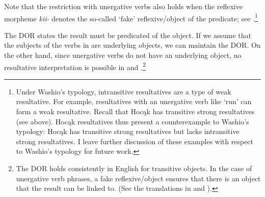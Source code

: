 \documentclass[output=paper]{LSP/langsci}
\begin{document}
\begin{exe}
\ex
\begin{xlist}



\end{xlist}
\end{exe}

Note that the restriction with unergative verbs also holds when the reflexive morpheme \textit{kii-} denotes the so-called `fake' reflexive/object of the predicate; see .\footnote{Under Washio's  typology, intransitive resultatives are a type of weak resultative. For example, resultatives with an unergative verb like `run' can form a weak resultative. Recall that Hocąk has transitive strong resultatives (see  above). Hocąk resultatives thus present a counterexample to Washio's typology: Hocąk has transitive strong resultatives but lacks intransitive strong resultatives. I leave further discussion of these examples with respect to Washio's typology for future work.}

\begin{exe}


\end{exe}

The DOR states the result must be predicated of the object. If we assume that the subjects of the verbs in  are underlying objects, we can maintain the DOR. On the other hand, since unergative verbs do not have an underlying object, no resultative interpretation is possible in  and .\footnote{The DOR holds consistently in English for transitive objects. In the case of unergative verb phrases, a fake reflexive/object ensures that there is an object that the result can be linked to. (See the translations in  and ).}
\end{document}
